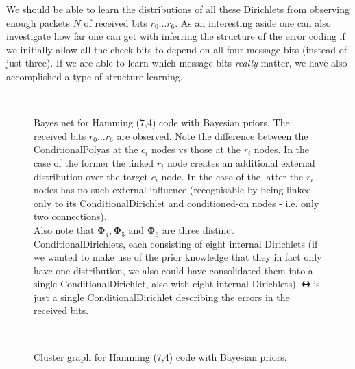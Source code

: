 \documentclass[oneside,english]{scrbook}
\begin{document}
We should be able to learn the distributions of all these Dirichlets
from observing enough packets $N$ of received bits $r_0 \ldots
r_6$. As an interesting aside one can also investigate how far one can
get with inferring the structure of the error coding if we initially
allow all the check bits to depend on all four message bits (instead
of just three). If we are able to learn which message bits
\emph{really} matter, we have also accomplished a type of structure
learning.

\begin{figure}[htb]
  \begin{centering}
    \\
    \caption{Bayes net for Hamming (7,4) code with Bayesian
      priors. The received bits $r_0\ldots r_6$ are observed. Note the
      difference between the ConditionalPolyas at the $c_i$ nodes vs
      those at the $r_i$ nodes. In the case of the former the linked
      $r_i$ node creates an additional external distribution over the
      target $c_i$ node. In the case of the latter the $r_i$ nodes has
      no such external influence (recognisable by being linked only to
      its ConditionalDirichlet and conditioned-on nodes - i.e. only
      two connections). \\ Also note that $\bm{\Phi}_4, \bm{\Phi}_5
      \text{ and } \bm{\Phi}_6$ are three distinct
      ConditionalDirichlets, each consisting of eight internal
      Dirichlets (if we wanted to make use of the prior knowledge that
      they in fact only have one distribution, we also could have
      consolidated them into a single ConditionalDirichlet, also with
      eight internal Dirichlets). $\bm{\Theta}$ is just a single
      ConditionalDirichlet describing the errors in the received
      bits. \label{fig:hamming74b_bn} }
  \end{centering}
\end{figure}

\begin{figure}[htb]
  \begin{centering}
    \\
    \caption{Cluster graph for Hamming (7,4) code with Bayesian
      priors.\label{fig:hamming74b_cg} }
  \end{centering}
\end{figure}

\FloatBarrier
\end{document}
